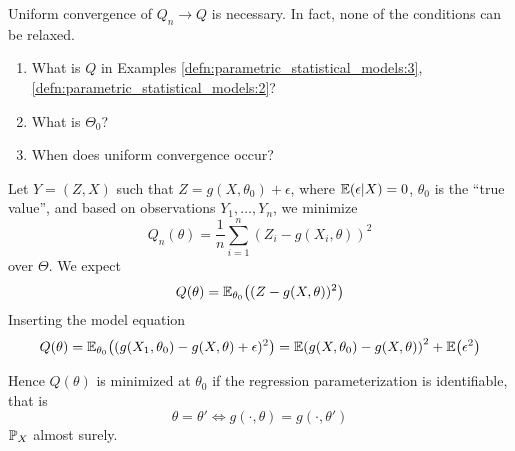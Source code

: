 \begin{remark}
  Uniform convergence of $Q_{n} \rightarrow Q$ is necessary. In fact,
  none of the conditions can be relaxed.
\end{remark}

\begin{exer}
  \begin{enumerate}
  \item What is $Q$ in Examples
    \ref{defn:parametric_statistical_models:3}, \ref{defn:parametric_statistical_models:2}?
  \item What is $\Theta_{0}$?
  \item When does uniform convergence occur?
  \end{enumerate}
\end{exer}

\begin{exmp}
  \label{defn:parametric_statistical_models:4}
  Let $Y = (Z, X)$ such that $Z = g(X, \theta_{0}) + \epsilon$, where
  $\E{\epsilon | X} = 0$, $\theta_{0}$ is the ``true value'', and
  based on \iid observations $Y_{1}, \dots, Y_{n}$, we minimize
  \begin{equation}
    \label{eq:38}
    Q_{n}(\theta)= \frac{1}{n} \sum_{i=1}^{n} (Z_{i} - g(X_{i}, \theta))^{2}
  \end{equation} over $\Theta$.  We expect
  \begin{equation}
    \label{eq:40}
    Q(\theta) = \E{(Z - g(X, \theta))^{2}}{\theta_{0}}
  \end{equation}  Inserting the model equation
  \begin{equation}
    \label{eq:41}
    Q(\theta) = \E{(g(X_{1}, \theta_{0}) - g(X,
    \theta) + \epsilon)^{2}}{\theta_{0}} = \E{g(X, \theta_{0}) - g(X, \theta)}^{2}
    + \E{\epsilon^{2}}
  \end{equation}

  Hence $Q(\theta)$ is minimized at $\theta_{0}$ if the regression
  parameterization is identifiable, that is
  \begin{equation}
    \label{eq:42}
    \theta = \theta' \iff g(\cdot, \theta) = g(\cdot, \theta')
  \end{equation} ${\Prob}_{X}$ almost surely.
\end{exmp}

